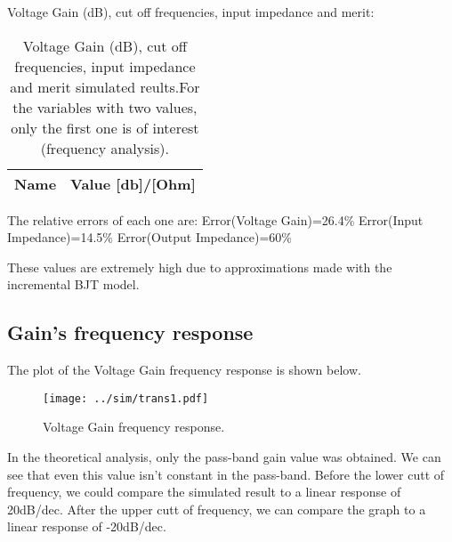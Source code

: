 Voltage Gain (dB), cut off frequencies, input impedance and merit:

\begin{table}[h]
  \centering
  \begin{tabular}{|l|r|}
    \hline    
    {\bf Name} & {\bf Value [db]/[Ohm]} \\ \hline
    
  \end{tabular}
  \caption{Voltage Gain (dB), cut off frequencies, input impedance and merit simulated reults.For the variables with two values, only the first one is of interest (frequency analysis).}
  
  \label{tab:sim_freq2}
\end{table}

The relative errors of each one are:
Error(Voltage Gain)=26.4\%
Error(Input Impedance)=14.5\%
Error(Output Impedance)=60\%

These values are extremely high due to approximations made with the incremental BJT model.

\subsection{Gain's frequency response}

The plot of the Voltage Gain frequency response is shown below.

\begin{figure}[h] \centering
\texttt{[image: ../sim/trans1.pdf]}
\caption{Voltage Gain frequency response.}
\label{fig:VG}
\end{figure}

In the theoretical analysis, only the pass-band gain value was obtained. We can see that even this value isn't constant in the pass-band. Before the lower cutt of frequency, we could compare the simulated result to a linear response of 20dB/dec. After the upper cutt of frequency, we can compare the graph to a linear response of -20dB/dec.

























